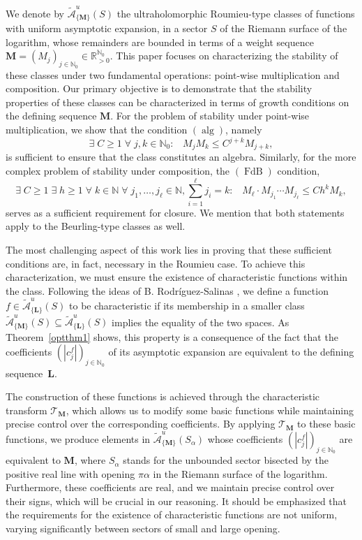 \documentclass[11pt,a4paper]{article}
\theoremstyle{plain}
\theoremstyle{definition}
\newcommand{\RR}{\mathbb{R}}
\newcommand{\NN}{\mathbb{N}}
\newcommand{\M}{\mathbf{M}}
\newcommand{\LL}{\mathbf{L}}
\let\on=\operatorname
\def\a{\alpha}
\begin{document}
We denote by $\mathcal{\widetilde{A}}^{u}_{\{\M\}}(S)$ the ultraholomorphic Roumieu-type classes of functions with uniform asymptotic expansion, in a sector $S$ of the Riemann surface of the logarithm, whose remainders are bounded in terms of a weight sequence $\M = (M_j)_{j\in\mathbb{N}_0} \in \RR_{>0}^{\NN_0}$. This paper focuses on characterizing the stability of these classes under two fundamental operations: point-wise multiplication and composition. Our primary objective is to demonstrate that the stability properties of these classes can be characterized in terms of growth conditions on the defining sequence $\M$. For the problem of stability under point-wise multiplication, we show that the condition \hyperlink{s-alg}{$(\on{alg})$}, namely
$$\exists\;C\ge 1\;\forall\;j,k\in\NN_0:\;\;\;M_j M_k\le C^{j+k}M_{j+k},
$$
is sufficient to ensure that the class constitutes an algebra. Similarly, for the more complex problem of stability under composition, the \hyperlink{s-FdB}{$(\on{FdB})$} condition,
$$\exists\;C\ge 1\;\exists\;h\ge 1\;\forall\;k\in\NN \;\forall\;j_1,\dots,j_\ell\in\NN, \sum_{i=1}^{\ell}j_i=k:\;\;\;M_\ell\cdot M_{j_1}\cdots M_{j_{\ell}}\le Ch^kM_k,$$
serves as a sufficient requirement for closure. We mention that both statements apply to the Beurling-type classes as well.

The most challenging aspect of this work lies in proving that these sufficient conditions are, in fact, necessary in the Roumieu case. To achieve this characterization, we must ensure the existence of characteristic functions within the class. Following the ideas of B. Rodríguez-Salinas \cite{salinas62}, we define a function $f \in \widetilde{\mathcal{A}}^u_{\{\LL\}} (S)$ to be characteristic if its membership in a smaller class $\widetilde{\mathcal{A}}^u_{\{\M\}} (S) \subseteq \widetilde{\mathcal{A}}^u_{\{\LL\}} (S)$ implies the equality of the two spaces. As Theorem~\ref{optthm1} shows, this property is a consequence of the fact that the coefficients $(|c^f_j|)_{j\in\NN_0}$ of its asymptotic expansion are equivalent to the defining sequence~$\LL$.

The construction of these functions is achieved through the characteristic transform $\mathcal{T}_{\M}$, which allows us to modify some basic functions while maintaining precise control over the corresponding coefficients. By applying $\mathcal{T}_{\M}$ to these basic functions, we produce elements in $\widetilde{\mathcal{A}}^u_{\{\M\}} (S_{\alpha})$ whose coefficients $(|c_j^f|)_{j\in\NN_0}$ are equivalent to $\M$, where $S_{\alpha}$ stands for the unbounded sector bisected by the positive real line with opening $\pi\a$ in the Riemann surface of the logarithm. Furthermore, these coefficients are real, and we maintain precise control over their signs, which will be crucial in our reasoning. It should be emphasized that the requirements for the existence of characteristic functions are not uniform, varying significantly between sectors of small and large opening.
\end{document}
